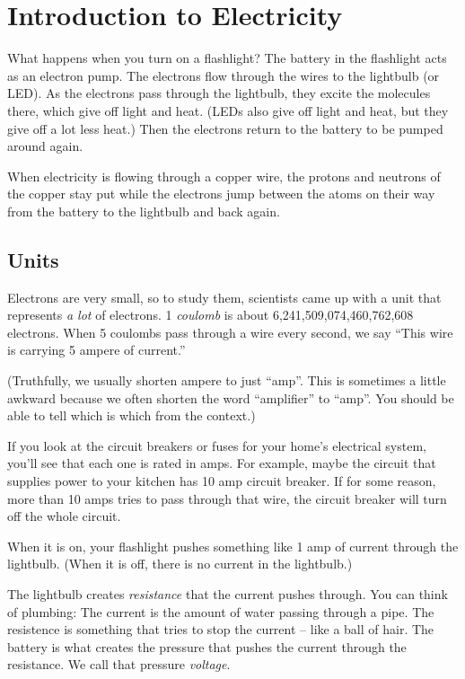 \chapter{Introduction to Electricity}

What happens when you turn on a flashlight?  The battery in the
flashlight acts as an electron pump. The electrons flow through the
wires to the lightbulb (or LED).  As the electrons pass through the
lightbulb, they excite the molecules there, which give off light and
heat. (LEDs also give off light and heat, but they give off a lot less
heat.) Then the electrons return to the battery to be pumped around
again.

When electricity is flowing through a copper wire, the protons and
neutrons of the copper stay put while the electrons jump between the
atoms on their way from the battery to the lightbulb and back again.

\section{Units}

Electrons are very small, so to study them, scientists came up with a
unit that represents \textit{a lot} of electrons. 1 \textit{coulomb}
is about 6,241,509,074,460,762,608 electrons.  When 5 coulombs pass
through a wire every second, we say ``This wire is carrying 5 ampere of
current.''

(Truthfully, we usually shorten ampere to just ``amp''.  This is
sometimes a little awkward because we often shorten the word
``amplifier'' to ``amp''. You should be able to tell which is which
from the context.)

If you look at the circuit breakers or fuses for your home's
electrical system, you'll see that each one is rated in amps.  For
example, maybe the circuit that supplies power to your kitchen has 10
amp circuit breaker. If for some reason, more than 10 amps tries to
pass through that wire, the circuit breaker will turn off the whole
circuit.

When it is on, your flashlight pushes something like 1 amp of current
through the lightbulb. (When it is off, there is no current in the
lightbulb.)

The lightbulb creates \textit{resistance} that the current pushes
through. You can think of plumbing: The current is the amount of water
passing through a pipe. The resistence is something that tries to stop
the current -- like a ball of hair.  The battery is what creates the
pressure that pushes the current through the resistance. We call that
pressure \textit{voltage}.

